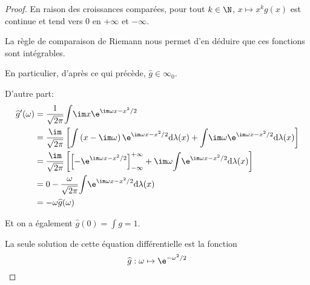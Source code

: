 \begin{proof}
En raison des croissances comparées, pour tout $k \in \N$, $x \mapsto x^k g(x)$ est continue et tend vers $0$ en $+\infty$ et $-\infty$. 

La règle de comparaison de Riemann nous permet d'en déduire que ces fonctions sont intégrables.

En particulier, d'après ce qui précède, $\widehat{g} \in \mathcal{\infty}_0$.

D'autre part:
\begin{align*}
\widehat{g}'(\omega) & = \dfrac{1}{\sqrt{2 \pi}}\displaystyle{\int} \im x \e^{\im \omega x -x^2/2} \\
 & = \dfrac{\im}{\sqrt{2 \pi}}\left[\displaystyle{\int} \left(x- \im \omega\right) \e^{\im \omega x -x^2/2} \mathrm d \lambda(x) +
 \displaystyle{\int} \im \omega \e^{\im \omega x -x^2/2} \mathrm d \lambda(x)\right] \\
 & = \dfrac{\im}{\sqrt{2 \pi}}\left[\left[-\e^{\im \omega x -x^2/2}\right]_{-\infty}^{+\infty} +
\im \omega  \displaystyle{\int} \e^{\im \omega x -x^2/2} \mathrm d \lambda(x)\right] \\
 & = 0 - \dfrac{\omega}{\sqrt{2\pi}} \displaystyle{\int} \e^{\im \omega x -x^2/2} \mathrm d \lambda(x) \\
 & = -\omega \widehat{g}(\omega)
\end{align*}

Et on a également $\widehat{g}(0) = \displaystyle{\int} g =1$.

La seule solution de cette équation différentielle est la fonction 
\[
\widehat{g}: \omega \mapsto \e^{-\omega^2/2}
\]

\end{proof}





